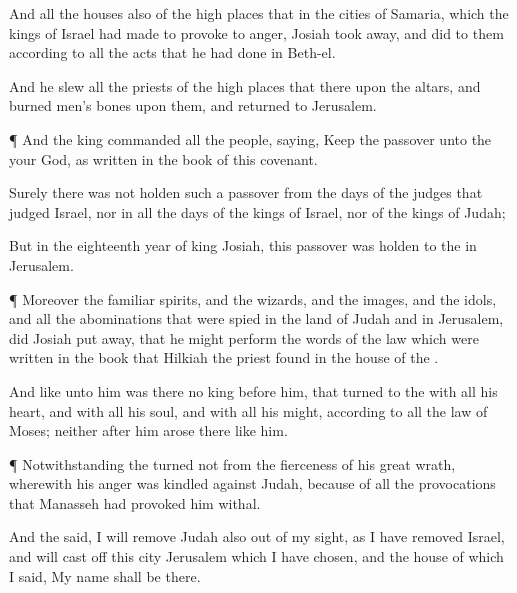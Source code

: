 {And all the
houses also of the high
places that
{} in the
cities of
Samaria, which the
kings of
Israel had
made to provoke
{} to
anger,
Josiah took
away, and
did to them according to all the
acts that he had
done in
Beth-el.

And he
slew all the
priests of the high
places that
{} there upon the
altars, and
burned
men’s
bones upon them, and
returned to
Jerusalem.


\par }{\PP {}¶ And the
king
commanded all the
people,
saying,
Keep the
passover unto the
{} your
God, as
{}
written in the
book of this
covenant.

Surely there was not
holden such a
passover from the
days of the
judges that
judged
Israel, nor in all the
days of the
kings of
Israel, nor of the
kings of
Judah;

But in the
eighteenth
year of
king
Josiah,
{} this
passover was
holden to the
{} in
Jerusalem.


\par }{\PP {}¶ Moreover the
{} familiar
spirits, and the
wizards, and the
images, and the
idols, and all the
abominations that were
spied in the
land of
Judah and in
Jerusalem, did
Josiah put
away, that he might
perform the
words of the
law which were
written in the
book that
Hilkiah the
priest
found in the
house of the
{}.


\par }{\PP {}And like unto him was there no
king
before him, that
turned to the
{} with all his
heart, and with all his
soul, and with all his
might, according to all the
law of
Moses; neither
after him
arose there
{} like him.


\par }{\PP {}¶ Notwithstanding the
{}
turned not from the
fierceness of his
great
wrath, wherewith his
anger was
kindled against
Judah, because of all the
provocations that
Manasseh had
provoked him withal.

And the
{}
said, I will
remove
Judah also out of my
sight, as I have
removed
Israel, and will cast
off this
city
Jerusalem which I have
chosen, and the
house of which I
said, My
name shall be there.

}
